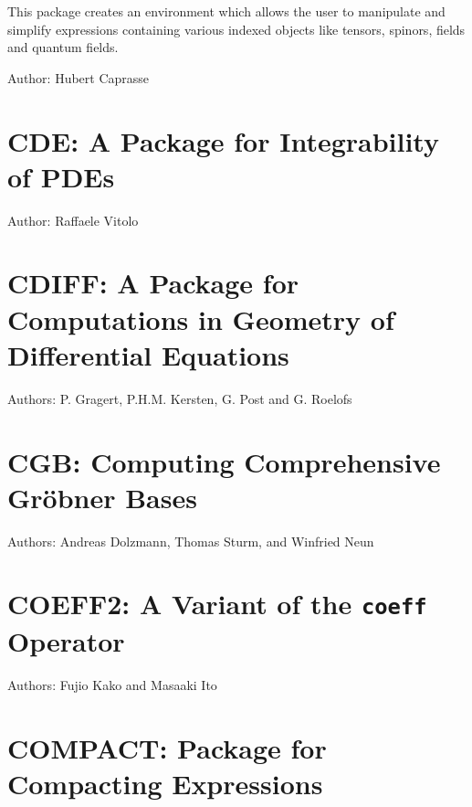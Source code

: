 
This package creates an environment which allows the user to
manipulate and simplify expressions containing various indexed objects
like tensors, spinors, fields and quantum fields.

Author: Hubert Caprasse



\newpage

\section{CDE: A Package for Integrability of PDEs}

Author: Raffaele Vitolo



\newpage

\section{CDIFF: A Package for Computations in Geometry
  of Differential Equations}
\label{CDIFF}


Authors: P. Gragert, P.H.M. Kersten, G. Post and G. Roelofs



\newpage

\section{CGB: Computing Comprehensive Gr\"obner Bases}

Authors: Andreas Dolzmann, Thomas Sturm, and Winfried Neun



\newpage

\section{COEFF2: A Variant of the \texttt{coeff} Operator}

Authors: Fujio Kako and Masaaki Ito



\newpage

\iffalse
\section{COMPACT: Package for Compacting Expressions}

